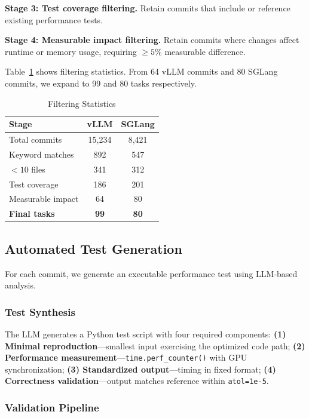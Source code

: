\documentclass{article}
\theoremstyle{plain}
\theoremstyle{definition}
\theoremstyle{remark}
\begin{document}
\textbf{Stage 3: Test coverage filtering.} Retain commits that include or reference existing performance tests.

\textbf{Stage 4: Measurable impact filtering.} Retain commits where changes affect runtime or memory usage, requiring $\geq5\%$ measurable difference.

Table~\ref{tab:filtering} shows filtering statistics. From 64 vLLM commits and 80 SGLang commits, we expand to 99 and 80 tasks respectively.

\begin{table}[t]
\caption{Filtering Statistics}
\label{tab:filtering}
\centering
\small
\begin{tabular}{lcc}
\toprule
\textbf{Stage} & \textbf{vLLM} & \textbf{SGLang} \\
\midrule
Total commits & 15,234 & 8,421 \\
Keyword matches & 892 & 547 \\
$<10$ files & 341 & 312 \\
Test coverage & 186 & 201 \\
Measurable impact & 64 & 80 \\
\textbf{Final tasks} & \textbf{99} & \textbf{80} \\
\bottomrule
\end{tabular}
\end{table}

\subsection{Automated Test Generation}

For each commit, we generate an executable performance test using LLM-based analysis.

\subsubsection{Test Synthesis}

The LLM generates a Python test script with four required components: \textbf{(1) Minimal reproduction}---smallest input exercising the optimized code path; \textbf{(2) Performance measurement}---\texttt{time.perf\_counter()} with GPU synchronization; \textbf{(3) Standardized output}---timing in fixed format; \textbf{(4) Correctness validation}---output matches reference within \texttt{atol=1e-5}.

\subsubsection{Validation Pipeline}
\end{document}

